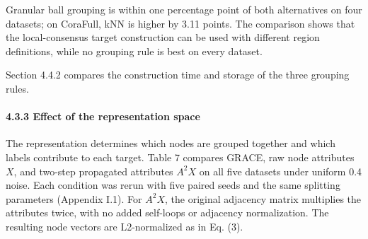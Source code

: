 Granular ball grouping is within one percentage point of both alternatives on four datasets; on CoraFull, kNN is higher by 3.11 points. The comparison shows that the local-consensus target construction can be used with different region definitions, while no grouping rule is best on every dataset.

Section 4.4.2 compares the construction time and storage of the three grouping rules.

\paragraph{4.3.3 Effect of the representation space}\label{effect-of-the-representation-space}

The representation determines which nodes are grouped together and which labels contribute to each target. Table 7 compares GRACE, raw node attributes \(\mathit{X}\), and two-step propagated attributes \(\mathit{A}^{2}\mathit{X}\) on all five datasets under uniform 0.4 noise. Each condition was rerun with five paired seeds and the same splitting parameters (Appendix I.1). For \(\mathit{A}^{2}\mathit{X}\), the original adjacency matrix multiplies the attributes twice, with no added self-loops or adjacency normalization. The resulting node vectors are L2-normalized as in Eq. (3).

